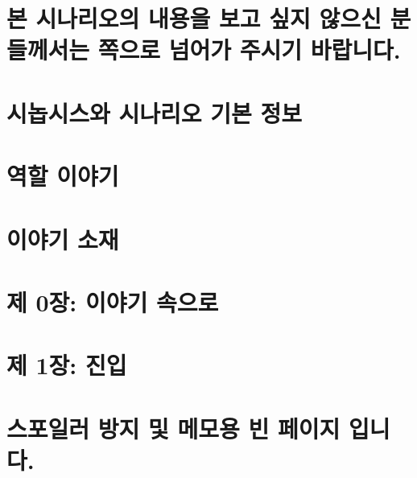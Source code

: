 \documentclass{report}
\begin{document}
	\chapter*{본 시나리오의 내용을 보고 싶지 않으신 분들께서는 \pageref{endof_House}쪽으로 넘어가 주시기 바랍니다.}
	
	\chapter{시놉시스와 시나리오 기본 정보}
	
	\parttoc
	
	\chapter{역할 이야기}
		
	\chapter{이야기 소재}
	
	\chapter{제 0장: 이야기 속으로}
	
	\chapter{제 1장: 진입}
	
	\chapter*{스포일러 방지 및 메모용 빈 페이지 입니다.}
\end{document}

